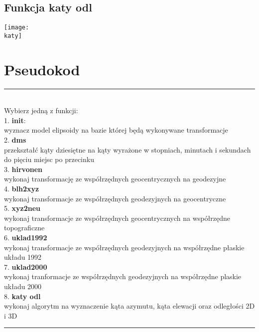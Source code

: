 \documentclass[10pt,a4paper]{article}
\begin{document}
	\subsection{Funkcja katy odl}
	\begin{center}
		\newcommand{\katy}{settings/katy.png}
		\texttt{[image: \\katy]}
	\end{center}
	
	\newpage
	\section{Pseudokod}
	\rule{\textwidth}{.5pt} \\
	Wybierz jedną z funkcji: \\
	1. \textbf{init}: \\
	wyznacz model elipsoidy na bazie której będą wykonywane transformacje \\
	2. \textbf{dms} \\
	przekształć kąty dziesiętne na kąty wyrażone w stopniach, minutach i sekundach do pięciu miejsc po przecinku \\
	3. \textbf{hirvonen} \\
	wykonaj transformację ze współrzędnych geocentrycznych na geodezyjne \\
	4. \textbf{blh2xyz} \\
	wykonaj transformacje ze współrzędnych geodezyjnych na geocentryczne \\
	5. \textbf{xyz2neu} \\
	wykonaj transformacje ze współrzędnych geocentrycznych na współrzędne topograficzne \\
	6. \textbf{uklad1992} \\
	wykonaj transformacje ze współrzędnych geodezyjnych na współrzędne płaskie układu 1992 \\
	7. \textbf{uklad2000} \\
	wykonaj tranformacje ze współrzędnych geodezyjnych na współrzędne plaskie układu 2000 \\
	8. \textbf{katy odl} \\
	wykonaj algorytm na wyznaczenie kąta azymutu, kąta elewacji oraz odległości 2D i 3D \\
	\rule{\textwidth}{.5pt} \\
	
\end{document}
